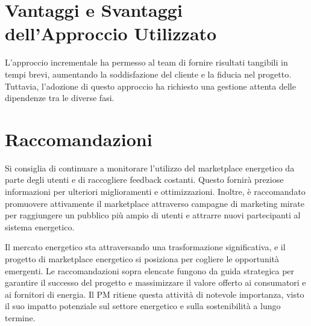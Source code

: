 \documentclass{report}
\begin{document}
\section*{Vantaggi e Svantaggi dell'Approccio Utilizzato}
L'approccio incrementale ha permesso al team di fornire risultati tangibili in tempi brevi, aumentando la soddisfazione del cliente e la fiducia nel progetto. Tuttavia, l'adozione di questo approccio ha richiesto una gestione attenta delle dipendenze tra le diverse fasi.

\section*{Raccomandazioni}
Si consiglia di continuare a monitorare l'utilizzo del marketplace energetico da parte degli utenti e di raccogliere feedback costanti. Questo fornirà preziose informazioni per ulteriori miglioramenti e ottimizzazioni.
Inoltre, è raccomandato promuovere attivamente il marketplace attraverso campagne di marketing mirate per raggiungere un pubblico più ampio di utenti e attrarre nuovi partecipanti al sistema energetico.

Il mercato energetico sta attraversando una trasformazione significativa, e il progetto di marketplace energetico si posiziona per cogliere le opportunità emergenti. Le raccomandazioni sopra elencate fungono da guida strategica per garantire il successo del progetto e massimizzare il valore offerto ai consumatori e ai fornitori di energia.
Il PM ritiene questa attività di notevole importanza, visto il suo impatto potenziale sul settore energetico e sulla sostenibilità a lungo termine.
\end{document}
